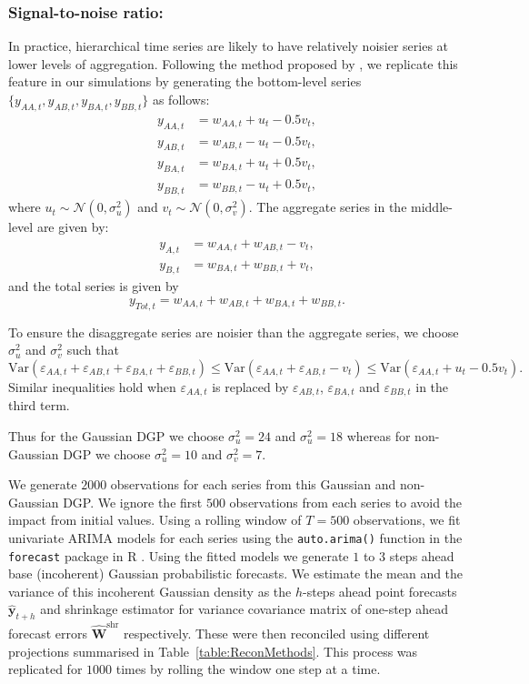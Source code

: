 \documentclass[12pt]{article}
\def\var{\text{Var}}
\theoremstyle{definition}
\begin{document}
\subsubsection*{Signal-to-noise ratio:}

In practice, hierarchical time series are likely to have relatively noisier series at lower levels of aggregation. Following the method proposed by \citet{WicEtAl2019}, we replicate this feature in our simulations by generating the bottom-level series $\{y_{AA,t},y_{AB,t},y_{BA,t},y_{BB,t}\}$ as follows:
\begin{align*}
y_{AA,t} &= w_{AA,t} + u_t - 0.5v_t,\\
y_{AB,t} &= w_{AB,t} - u_t - 0.5v_t,\\
y_{BA,t} &= w_{BA,t} + u_t + 0.5v_t,\\
y_{BB,t} &= w_{BB,t} - u_t + 0.5v_t,
\end{align*}
where $u_t \sim \mathcal{N}(0,\sigma^2_u)$ and $v_t \sim \mathcal{N}(0,\sigma^2_v)$. The aggregate series in the middle-level are given by:
\begin{align*}
y_{A,t} &= w_{AA,t} + w_{AB,t} - v_t,\\
y_{B,t} &= w_{BA,t} + w_{BB,t} + v_t,
\end{align*}
and the total series is given by
\[
y_{Tot,t} = w_{AA,t} + w_{AB,t} + w_{BA,t} + w_{BB,t}.
\]


To ensure the disaggregate series are noisier than the aggregate series, we choose $\sigma^2_u$ and $\sigma^2_v$ such that
\[
\var(\varepsilon_{AA,t} + \varepsilon_{AB,t} + \varepsilon_{BA,t} + \varepsilon_{BB,t})
\le \var(\varepsilon_{AA,t}+\varepsilon_{AB,t}-v_t)
\le \var(\varepsilon_{AA,t}+u_t-0.5v_t).
\]
Similar inequalities hold when $\varepsilon_{AA,t}$ is replaced by $\varepsilon_{AB,t}$, $\varepsilon_{BA,t}$ and $\varepsilon_{BB,t}$ in the third term.

Thus for the Gaussian DGP we choose $\sigma^2_u = 24$ and $\sigma^2_u = 18$ whereas for non-Gaussian DGP we choose $\sigma^2_u = 10$ and $\sigma^2_v = 7$.

We generate $2000$ observations for each series from this Gaussian and non-Gaussian DGP. We ignore the first $500$ observations from each series to avoid the impact from initial values. Using a rolling window of $T=500$ observations, we fit univariate ARIMA models for each series using the \verb|auto.arima()| function in the \verb|forecast| package \citep{Rforecast} in R \citep{Rcore}. Using the fitted models we generate $1$ to $3$ steps ahead base (incoherent) Gaussian probabilistic forecasts. We estimate the mean and the variance of this incoherent Gaussian density as the $h$-steps ahead point forecasts $\hat{\bm{y}}_{t+h}$ and shrinkage estimator for variance covariance matrix of one-step ahead forecast errors $\hat{\bm{W}}^{\text{shr}}$ respectively. These were then reconciled using different projections summarised in Table~\ref{table:ReconMethods}. This process was replicated for $1000$ times by rolling the window one step at a time.
\end{document}
